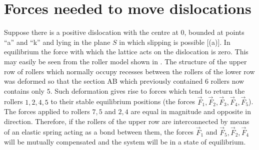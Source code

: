 \section{Forces needed to move dislocations}\label{sec:18}

Suppose there is a positive dislocation with the centre at $0$, bounded at points ``a'' and ``k'' and lying in the plane $S$ in which slipping is possible [(a)]. In equilibrium the force with which the lattice acts on the dislocation is zero. This may easily be seen from the roller model shown in . The structure of the upper row of rollers which normally occupy recesses between the rollers of the lower row was deformed so that the section AB which previously contained $6$ rollers now contains only $5$. Such deformation gives rise to forces which tend to return the rollers $1, 2, 4, 5$ to their stable equilibrium positions (the forces $\vec{F}_1, \vec{F}_2, \vec{F}_3, \vec{F}_4, \vec{F}_5$). The forces applied to rollers $7, 5$ and $2, 4$ are equal in magnitude and opposite in direction.
Therefore, if the rollers of the upper row are interconnected by means of an elastic spring acting as a bond between them, the forces $\vec{F}_1$ and $\vec{F}_5, \vec{F}_2, \vec{F}_4$ will be mutually compensated and the system will be in a state of equilibrium.


